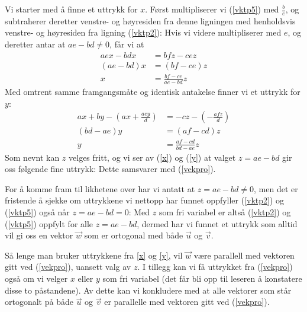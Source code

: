 Vi starter med å finne et uttrykk for $ x $. Først multipliserer vi (\ref{vktp5}) med $ \frac{b}{e} $, og subtraherer deretter venstre- og høyresiden fra denne ligningen med henholdsvis venstre- og høyresiden fra ligning (\ref{vktp2}):
Hvis vi videre multipliserer med $ e $, og deretter antar at $ ae-bd\neq0 $, får vi at
\begin{align}
	aex -bdx &= bfz-cez \nonumber\\
	(ae-bd)x &= (bf-ce)z\nonumber \\
	x &= \frac{bf-ce}{ae-bd}z \label{x}
\end{align}
Med omtrent samme framgangsmåte og identisk antakelse finner vi et uttrykk for $ y $:
\begin{align}
	ax+by -\left(ax+\frac{aey}{d}\right)&= -cz-\left(-\frac{afz}{d}\right) \nonumber\\
	(bd-ae)y &= (af-cd)z \nonumber\\
	y &= \frac{af-cd}{bd-ae}z \label{y}
\end{align}
Som nevnt kan $ z $ velges fritt, og vi ser av (\ref{x}) og (\ref{y}) at valget $ {z=ae-bd} $ gir oss følgende fine uttrykk:
Dette samsvarer med (\ref{vekpro}). \vsk

For å komme fram til likhetene over har vi antatt at $ {z=ae-bd\neq 0} $, men det er fristende å sjekke om uttrykkene vi nettopp har funnet oppfyller (\ref{vktp2}) og (\ref{vktp5}) også når ${ z=ae-bd=0} $:
Med $ z $ som fri variabel er altså (\ref{vktp2}) og (\ref{vktp5})  oppfylt for alle ${ z=ae-bd} $, dermed har vi funnet et uttrykk som alltid vil gi oss en vektor $ \vec{w} $ som er ortogonal med både $ \vec{u} $ og $ \vec{v} $. \vsk

Så lenge man bruker uttrykkene fra \eqref{x} og \eqref{y}, vil $ \vec{w} $ være parallell med vektoren gitt ved (\ref{vekpro}), uansett valg av $ z $. I tillegg kan vi få uttrykket fra (\ref{vekpro}) også om vi velger $ x $ eller $ y $ som fri variabel (det får bli opp til leseren å konstatere disse to påstandene).\label{allekrypropar} Av dette kan vi konkludere med at alle vektorer som står ortogonalt på både $ \vec{u} $ og $ \vec{v} $ er parallelle med vektoren gitt ved (\ref{vekpro}).

